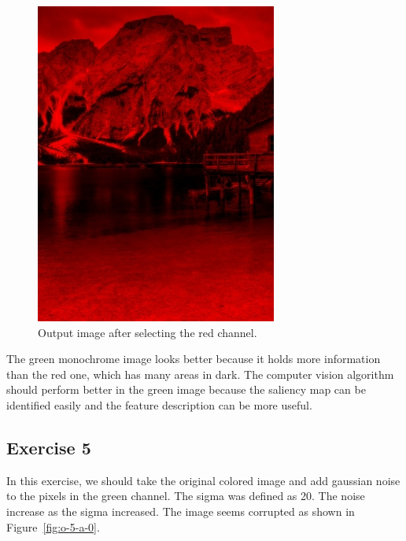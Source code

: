 \documentclass[]{IEEEtran}
\begin{document}
  \begin{figure}[!h]
    \centering
    \includegraphics[width=0.8\hsize]{../output/o-2-c-0.jpg}
    \caption{Output image after selecting the red channel.}
    \label{fig:o-2-c-0}
  \end{figure}
  
  The green monochrome image looks better because it holds more information than the red one, which has many areas in dark. The computer vision algorithm should perform better in the green image because the saliency map can be identified easily and the feature description can be more useful.
  
  
  
  \subsection{Exercise 5}
  
  In this exercise, we should take the original colored image and add gaussian noise to the pixels in the green channel. The sigma was defined as 20. The noise increase as the sigma increased. The image seems corrupted as shown in Figure~\ref{fig:o-5-a-0}.
  
\end{document}
